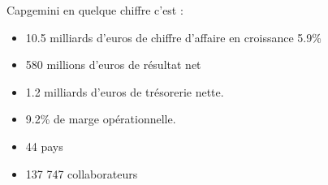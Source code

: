 Capgemini en quelque chiffre c'est :

\begin{itemize}
    \item 10.5 milliards d'euros de chiffre d'affaire en croissance 5.9\%
    \item 580 millions d'euros de résultat net 
    \item 1.2 milliards d'euros de trésorerie nette.
    \item 9.2\% de marge opérationnelle.
    \item 44 pays
    \item 137 747 collaborateurs
\end{itemize}